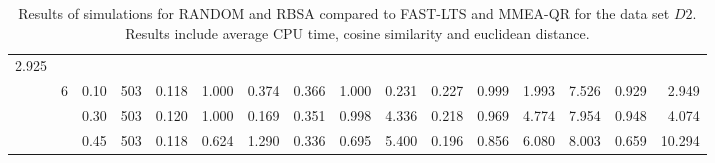 \documentclass[thesis=B,english]{FITthesis}[2012/10/20]
\begin{document}
\begin{table}[h!]
\begin{adjustbox}{angle=90}
{\begin{tabular}{ll|l|l|r|r|r|r|r|r|r|r|r|r|r|r|}
  2.925 \\     & 6 & 0.10 & 503 &    0.118 &  1.000 &  0.374 &   0.366 &  1.000 &  0.231 &  0.227 &  0.999 &  1.993 &  7.526 &  0.929 &   2.949 \\     &   & 0.30 & 503 &    0.120 &  1.000 &  0.169 &   0.351 &  0.998 &  4.336 &  0.218 &  0.969 &  4.774 &  7.954 &  0.948 &   4.074 \\     &   & 0.45 & 503 &    0.118 &  0.624 &  1.290 &   0.336 &  0.695 &  5.400 &  0.196 &  0.856 &  6.080 &  8.003 &  0.659 &  10.294 \\
                         
                 \hline
                \end{tabular}
			}
			
\end{adjustbox}
    
    \caption{Results of simulations for RANDOM and RBSA  compared to FAST-LTS and MMEA-QR for the data set $D2$. Results include average CPU time, cosine similarity and euclidean distance.}
    \label{table:randim:2}
\end{table}
\end{document}
